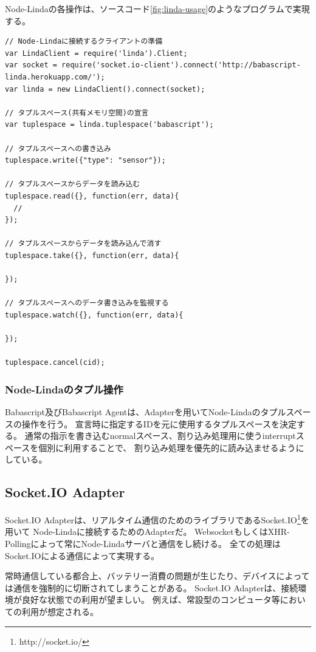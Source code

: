 Node-Lindaの各操作は、ソースコード\ref{fig:linda-usage}のようなプログラムで実現する。

\begin{lstlisting}[caption=Node-Lindaへの接続方法, label=code:linda-usage]
// Node-Lindaに接続するクライアントの準備
var LindaClient = require('linda').Client;
var socket = require('socket.io-client').connect('http://babascript-linda.herokuapp.com/');
var linda = new LindaClient().connect(socket);

// タプルスペース(共有メモリ空間)の宣言
var tuplespace = linda.tuplespace('babascript');

// タプルスペースへの書き込み
tuplespace.write({"type": "sensor"});

// タプルスペースからデータを読み込む
tuplespace.read({}, function(err, data){
  //
});

// タプルスペースからデータを読み込んで消す
tuplespace.take({}, function(err, data){

});

// タプルスペースへのデータ書き込みを監視する
tuplespace.watch({}, function(err, data){

});

tuplespace.cancel(cid);
\end{lstlisting}

\subsubsection{Node-Lindaのタプル操作}\label{node-lindaux306eux30bfux30d7ux30ebux64cdux4f5c}

Babascript及びBabascript
Agentは、Adapterを用いてNode-Lindaのタプルスペースの操作を行う。
宣言時に指定するIDを元に使用するタプルスペースを決定する。
通常の指示を書き込むnormalスペース、割り込み処理用に使うinterruptスペースを個別に利用することで、
割り込み処理を優先的に読み込ませるようにしている。

\subsection{Socket.IO Adapter}\label{socket.io-adapter}

Socket.IO
Adapterは、リアルタイム通信のためのライブラリであるSocket.IO\footnote{http://socket.io/}を用いて
Node-Lindaに接続するためのAdapterだ。
WebsocketもしくはXHR-Pollingによって常にNode-Lindaサーバと通信をし続ける。
全ての処理はSocket.IOによる通信によって実現する。

常時通信している都合上、バッテリー消費の問題が生じたり、デバイスによっては通信を強制的に切断されてしまうことがある。
Socket.IO Adapterは、接続環境が良好な状態での利用が望ましい。
例えば、常設型のコンピュータ等においての利用が想定される。

